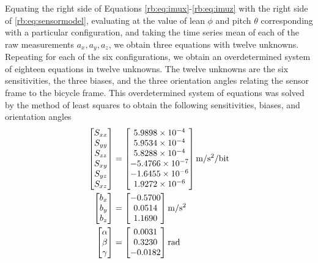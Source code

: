 Equating the right side of Equations \ref{rb:eq:imux}-\ref{rb:eq:imuz} with the
right side of \autoref{rb:eq:sensormodel}, evaluating at the value of lean
$\phi$ and pitch $\theta$ corresponding with a particular configuration, and
taking the time series mean of each of the raw measurements $a_x, a_y, a_z$, we
obtain three equations with twelve unknowns. Repeating for each of the six
configurations, we obtain an overdetermined system of eighteen equations in
twelve unknowns. The twelve unknowns are the six sensitivities, the three
biases, and the three orientation angles relating the sensor frame to the
bicycle frame. This overdetermined system of equations was solved by the method
of least squares to obtain the following sensitivities, biases, and orientation
angles
\begin{align}
  \left[
    \begin{matrix}
      S_{xx} \\
      S_{yy} \\
      S_{zz} \\
      S_{xy} \\
      S_{yz} \\
      S_{xz}
    \end{matrix}
  \right]
  &=
  \left[
    \begin{matrix}
      \num{5.9898e-4} \\
      \num{5.9534e-4} \\
      \num{5.8288e-4} \\
      \num{-5.4766e-7} \\
      \num{-1.6455e-6} \\
      \num{1.9272e-6}
    \end{matrix}
  \right] \text{m/s$^2$/bit} \\
  \left[
    \begin{matrix}
      b_{x} \\
      b_{y} \\
      b_{z}
    \end{matrix}
  \right]
  &=
  \left[
    \begin{matrix}
      -0.5700 \\
       0.0514 \\
       1.1690
    \end{matrix}
  \right] \text{\si{m/s^2}} \\
  \left[
    \begin{matrix}
      \alpha \\
      \beta \\
      \gamma
    \end{matrix}
  \right]
  &=
  \left[
    \begin{matrix}
      0.0031 \\
      0.3230 \\
     -0.0182
    \end{matrix}
  \right] \text{rad}
\end{align}
